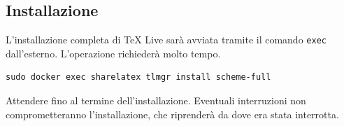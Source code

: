 \subsection{Installazione}
L'installazione completa di TeX Live sarà avviata tramite il comando \verb|exec| dall'esterno. L'operazione richiederà molto tempo.
\begin{lstlisting}
sudo docker exec sharelatex tlmgr install scheme-full
\end{lstlisting}
Attendere fino al termine dell'installazione. Eventuali interruzioni non comprometteranno l'installazione, che riprenderà da dove era stata interrotta.